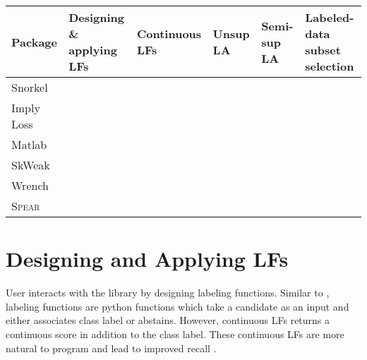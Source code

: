 \documentclass[11pt]{article}
\newcommand{\cmark}{\centering \ding{51}}%
\newcommand{\xmark}{ \ding{55}}
\newcommand{\spear}{\mbox{\textsc{Spear}}}
\begin{document}
    
    \begin{table*}[!h]
    \centering
    \begin{center}
    \begin{tabular}{|p{}|p{}|p{}|p{}|p{}|p{}|}
    \hline
         Package & Designing \& applying LFs & Continuous LFs & Unsup LA & Semi-sup LA & Labeled-data subset selection  \\
         \hline
         Snorkel\cite{ratner2017snorkel}  & \centering \cmark  & \centering \xmark &  \centering \xmark & \centering \cmark  &  {\hspace {3em}\xmark}  \\
         Imply Loss \citep{awasthi2020learning}  & \centering \xmark  & \centering \xmark & \centering \xmark  & \centering  \cmark & {\hspace {3em}\xmark}   \\
         Matlab  & \centering \cmark  & \centering \xmark & \centering \xmark &  \centering \xmark & {\hspace {3em}\xmark}     \\
         SkWeak \cite{lison-etal-2021-skweak}  & \centering \cmark  & \centering \cmark & \centering \cmark &  \centering \xmark & {\hspace {3em}\xmark}     \\
         Wrench \cite{zhang2021wrench}  & \centering \cmark  & \centering \xmark & \centering \cmark &  \centering \cmark & {\hspace {3em}\xmark}     \\
         \spear  & \centering \cmark  & \centering \cmark & \centering \cmark & \centering \cmark & {\hspace {3.2em}\cmark }  \\
         \hline
    \end{tabular}
    \caption{Comparison of \spear\ against available packages.
    \label{tab:comparisonTable}}
    \end{center}
\end{table*}


\section{Designing and Applying LFs}
User interacts with the library by designing labeling functions. Similar to \citet{ratner2017snorkel}, labeling functions are python functions which take a candidate as an input and either associates class label or abstains. However, continuous LFs returns a continuous score in addition to the class label. These continuous LFs are more
natural to program and lead to improved recall \cite{oishik}.
\end{document}
